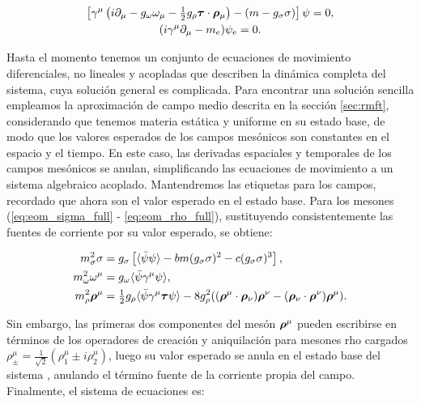 \begin{gather*}
	\left[ \gamma^\mu \left( i\partial_\mu - g_{\omega} \omega_\mu - \tfrac{1}{2} g_{\rho} \boldsymbol{\tau} \cdot \boldsymbol{\rho}_\mu \right) - (m - g_{\sigma} \sigma) \right] \psi = 0, \\
	(i\gamma^\mu \partial_\mu - m_e) \psi_e = 0.
\end{gather*}

Hasta el momento tenemos un conjunto de ecuaciones de movimiento diferenciales, no lineales y acopladas que describen la dinámica completa del sistema, cuya solución general es complicada. Para encontrar una solución sencilla empleamos la aproximación de campo medio descrita en la sección \ref{sec:rmft}, considerando que tenemos materia estática y uniforme en su estado base, de modo que los valores esperados de los campos mesónicos son constantes en el espacio y el tiempo. En este caso, las derivadas espaciales y temporales de los campos mesónicos se anulan, simplificando las ecuaciones de movimiento a un sistema algebraico acoplado. Mantendremos las etiquetas para los campos, recordado que ahora son el valor esperado en el estado base. Para los mesones (\ref{eq:eom_sigma_full} - \ref{eq:eom_rho_full}), sustituyendo consistentemente las fuentes de corriente por su valor esperado, se obtiene:

\begin{equation*}
	\begin{aligned}
		m_\sigma^2 \sigma &= g_\sigma \left[ \langle \bar{\psi} \psi \rangle - bm(g_\sigma\sigma)^2 - c(g_\sigma\sigma)^3\right], \\
		m_\omega^2 \omega^\mu &= g_{\omega} \langle \bar{\psi} \gamma^\mu \psi \rangle, \\
		m_\rho^2 \boldsymbol{\rho}^\mu &= \tfrac{1}{2} g_{\rho} \langle \bar{\psi} \gamma^\mu \boldsymbol{\tau} \psi \rangle - 8g_\rho^2( (\boldsymbol{\rho}^\mu \cdot \boldsymbol{\rho}_\nu)\boldsymbol{\rho}^\nu - (\boldsymbol{\rho}_\nu \cdot \boldsymbol{\rho}^\nu)\boldsymbol{\rho}^\mu).
	\end{aligned}
\end{equation*}

Sin embargo, las primeras dos componentes del mesón $\boldsymbol{\rho}^\mu$ pueden escribirse en términos de los operadores de creación y aniquilación para mesones rho cargados $\rho_\pm^\mu = \frac{1}{\sqrt{2}}(\rho_1^\mu\pm i\rho_2^\mu)$, luego su valor esperado se anula en el estado base del sistema \cite{glendenningCompactStarsNuclear2000}, anulando el término fuente de la corriente propia del campo. Finalmente, el sistema de ecuaciones es:

